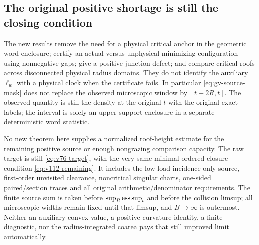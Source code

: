 \subsection{The original positive shortage is still the closing condition}
The new results remove the need for a physical critical anchor in the
geometric word enclosure; certify an actual-versus-unphysical minimizing
configuration using nonnegative gaps; give a positive junction defect;
and compare critical roofs across disconnected physical radius domains.
They do not identify the auxiliary $\ell_w$ with a physical clock when
the certificate fails. In particular \eqref{eq:gv-source-mask} does not
replace the observed microscopic window by $[t-2R,t]$. The observed
quantity is still the density at the original $t$ with the original
exact labels; the interval is solely an upper-support enclosure in a
separate deterministic word statistic.

No new theorem here supplies a normalized roof-height estimate for the
remaining positive source or enough nongrazing comparison capacity.
The raw target is still \eqref{eq:v76-target}, with the very same minimal
ordered closure condition \eqref{eq:v112-remaining}. It includes the
low-load incidence-only source, first-order unvisited clearance,
noncritical singular charts, one-sided paired/section traces and all
original arithmetic/denominator requirements. The finite source sum is
taken before $\sup_R\operatorname*{ess\,sup}_t$ and before the collision limsup; all
microscopic widths remain fixed until that limsup, and $B\to\infty$
is outermost. Neither an auxiliary convex value, a positive curvature
identity, a finite diagnostic, nor the radius-integrated coarea pays
that still unproved limit automatically.
